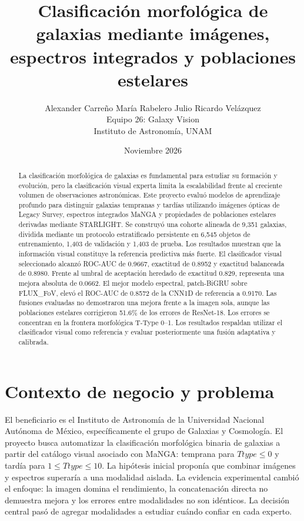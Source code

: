 \documentclass[letterpaper,11pt]{article}
\title{\textbf{Clasificación morfológica de galaxias mediante imágenes, espectros integrados y poblaciones estelares}}
\author{Alexander Carreño \quad María Rabelero \quad Julio Ricardo Velázquez\\Equipo 26: Galaxy Vision\\Instituto de Astronomía, UNAM}
\date{Noviembre 2026}
\begin{document}
\maketitle
\begin{abstract}
La clasificación morfológica de galaxias es fundamental para estudiar su formación y evolución, pero la clasificación visual experta limita la escalabilidad frente al creciente volumen de observaciones astronómicas. Este proyecto evaluó modelos de aprendizaje profundo para distinguir galaxias tempranas y tardías utilizando imágenes ópticas de Legacy Survey, espectros integrados MaNGA y propiedades de poblaciones estelares derivadas mediante STARLIGHT. Se construyó una cohorte alineada de 9,351 galaxias, dividida mediante un protocolo estratificado persistente en 6,545 objetos de entrenamiento, 1,403 de validación y 1,403 de prueba. Los resultados muestran que la información visual constituye la referencia predictiva más fuerte. El clasificador visual seleccionado alcanzó ROC-AUC de 0.9667, exactitud de 0.8952 y exactitud balanceada de 0.8980. Frente al umbral de aceptación heredado de exactitud 0.829, representa una mejora absoluta de 0.0662. El mejor modelo espectral, patch-BiGRU sobre FLUX\_FoV, elevó el ROC-AUC de 0.8572 de la CNN1D de referencia a 0.9170. Las fusiones evaluadas no demostraron una mejora frente a la imagen sola, aunque las poblaciones estelares corrigieron 51.6\% de los errores de ResNet-18. Los errores se concentran en la frontera morfológica T-Type 0--1. Los resultados respaldan utilizar el clasificador visual como referencia y evaluar posteriormente una fusión adaptativa y calibrada.
\end{abstract}

\section{Contexto de negocio y problema}
El beneficiario es el Instituto de Astronomía de la Universidad Nacional Autónoma de México, específicamente el grupo de Galaxias y Cosmología. El proyecto busca automatizar la clasificación morfológica binaria de galaxias a partir del catálogo visual asociado con MaNGA: temprana para $Ttype\leq0$ y tardía para $1\leq Ttype\leq10$. La hipótesis inicial proponía que combinar imágenes y espectros superaría a una modalidad aislada. La evidencia experimental cambió el enfoque: la imagen domina el rendimiento, la concatenación directa no demuestra mejora y los errores entre modalidades no son idénticos. La decisión central pasó de agregar modalidades a estudiar cuándo confiar en cada experto.
\end{document}
